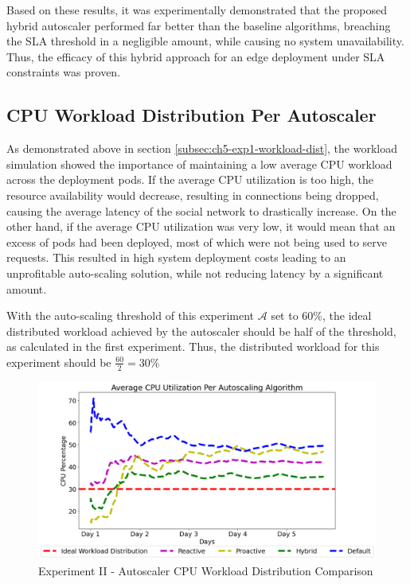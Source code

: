 Based on these results, it was experimentally demonstrated that the proposed hybrid autoscaler performed far better than the baseline algorithms, breaching the SLA threshold in a negligible amount, while causing no system unavailability. Thus, the efficacy of this hybrid approach for an edge deployment under SLA constraints was proven.

\subsection {CPU Workload Distribution Per Autoscaler}
\label{subsec:ch5-exp2-workload-dist}

As demonstrated above in section \ref{subsec:ch5-exp1-workload-dist}, the workload simulation showed the importance of maintaining a low average CPU workload across the deployment pods. If the average CPU utilization is too high, the resource availability would decrease, resulting in connections being dropped, causing the average latency of the social network to drastically increase. On the other hand, if the average CPU utilization was very low, it would mean that an excess of pods had been deployed, most of which were not being used to serve requests. This resulted in high system deployment costs leading to an unprofitable auto-scaling solution, while not reducing latency by a significant amount.\par

With the auto-scaling threshold of this experiment $\mathcal{A}$ set to 60\%, the ideal distributed workload achieved by the autoscaler should be half of the threshold, as calculated in the first experiment. Thus, the distributed workload for this experiment should be $\frac{60}{2} = 30\%$

\begin{figure}[htb]
    \centering
    \caption{Experiment II - Autoscaler CPU Workload Distribution Comparison}
    \label{fig:exp2-cpu-avg-dist}
    \includegraphics[width=0.6\linewidth]{Figures/Compose-Post-CPU-Usage.png}
\end{figure}

